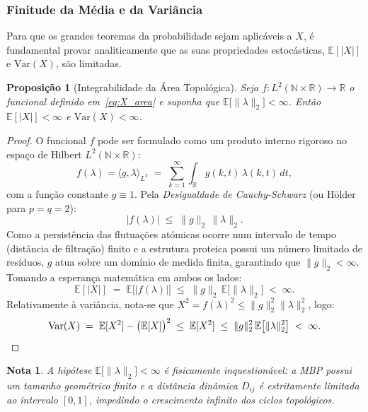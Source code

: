\documentclass[12pt, a4paper]{article}
\newtheorem{proposition}{Proposição}
\newtheorem*{remark}{Nota}
\begin{document}
\subsubsection{Finitude da Média e da Variância}
 
Para que os grandes teoremas da probabilidade sejam aplicáveis a $X$, é fundamental provar analiticamente que as suas propriedades estocásticas, $\mathbb{E}[|X|]$ e $\mathrm{Var}(X)$, são limitadas.
 
\begin{proposition}[Integrabilidade da Área Topológica]
  \label{prop:integrabilidade}
  Seja $f : L^2(\mathbb{N} \times \mathbb{R}) \to \mathbb{R}$ o funcional definido em~\eqref{eq:X_area} e suponha que $\mathbb{E}\bigl[\|\lambda\|_{2}\bigr] < \infty$. Então $\mathbb{E}[|X|] < \infty$ e $\mathrm{Var}(X) < \infty$.
\end{proposition}
 
\begin{proof}
  O funcional $f$ pode ser formulado como um produto interno rigoroso no espaço de Hilbert $L^{2}(\mathbb{N} \times \mathbb{R})$:
  \[
    f(\lambda) = \langle g, \lambda \rangle_{L^{2}} \;=\; \sum_{k=1}^{\infty} \int_{\mathbb{R}} g(k,t)\,\lambda(k,t)\,dt,
  \]
  com a função constante $g \equiv 1$. Pela \emph{Desigualdade de Cauchy-Schwarz} (ou Hölder para $p = q = 2$):
  \[
    |f(\lambda)| \;\le\; \|g\|_{2}\,\|\lambda\|_{2}.
  \]
  Como a persistência das flutuações atómicas ocorre num intervalo de tempo (distância de filtração) finito e a estrutura proteica possui um número limitado de resíduos, $g$ atua sobre um domínio de medida finita, garantindo que $\|g\|_{2} < \infty$. Tomando a esperança matemática em ambos os lados:
  \[
    \mathbb{E}[|X|] \;=\; \mathbb{E}\bigl[|f(\lambda)|\bigr] \;\le\; \|g\|_{2}\,\mathbb{E}\bigl[\|\lambda\|_{2}\bigr] \;<\; \infty.
  \]
  Relativamente à variância, nota-se que $X^{2} = f(\lambda)^{2} \le \|g\|_{2}^{2} \|\lambda\|_{2}^{2}$, logo:
  \[
    \mathrm{Var}(X) \;=\; \mathbb{E}[X^{2}] - \bigl(\mathbb{E}[X]\bigr)^{2} \;\le\; \mathbb{E}[X^{2}] \;\le\; \|g\|_{2}^{2}\,\mathbb{E}\bigl[\|\lambda\|_{2}^{2}\bigr] \;<\; \infty. \qedhere
  \]
\end{proof}
 
\begin{remark}
  A hipótese $\mathbb{E}\bigl[\|\lambda\|_{2}\bigr] < \infty$ é fisicamente inquestionável: a MBP possui um tamanho geométrico finito e a distância dinâmica $D_{ij}$ é estritamente limitada ao intervalo $[0,1]$, impedindo o crescimento infinito dos ciclos topológicos.
\end{remark}
 
\end{document}
